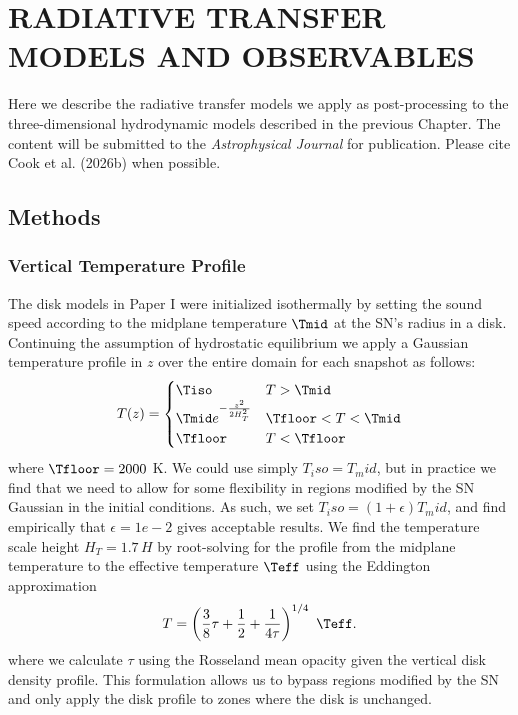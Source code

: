 \section{\texorpdfstring{\MakeUppercase{radiative transfer models and observables}}{radiative transfer models and observables}}
\label{sec:sn-rt}



Here we describe the radiative transfer models we apply as post-processing to the three-dimensional hydrodynamic models described in the previous Chapter.
The content will be submitted to the \textit{Astrophysical Journal} for publication.
Please cite Cook et al. (2026b) when possible.


\subsection{Methods} \label{sec:methods}


\subsubsection{Vertical Temperature Profile} \label{subsec:temperature-profile}

The disk models in Paper I were initialized isothermally by setting the sound speed according to the midplane temperature $\Tmid$ at the SN's radius in a \citet{SirkoGoodman03} disk.
Continuing the assumption of hydrostatic equilibrium we apply a Gaussian temperature profile in $z$ over the entire domain for each snapshot as follows:
\begin{equation}
\label{eqn:temp-profile}
    T(z) =
    \begin{cases}
	\Tiso & T>\Tmid \\
	\Tmid e^{- \frac{z^2}{2 H_T^2}} & \Tfloor < T < \Tmid \\
	\Tfloor & T<\Tfloor
    \end{cases}
\end{equation}
where $\Tfloor=2000$ K.
We could use simply $T_iso = T_mid$, but in practice we find that we need to allow for some flexibility in regions modified by the SN Gaussian in the initial conditions.
As such, we set $T_iso = (1+\epsilon) T_mid$, and find empirically that $\epsilon=1e-2$ gives acceptable results.
We find the temperature scale height $H_T=1.7\,H$ by root-solving for the profile from the midplane temperature to the effective temperature $\Teff$ using the Eddington approximation
\begin{equation}
	T = \left( \frac{3}{8} \tau + \frac{1}{2} + \frac{1}{4\tau} \right)^{1/4}\ \Teff.
\end{equation}
where we calculate $\tau$ using the Rosseland mean opacity given the vertical disk density profile.
This formulation allows us to bypass regions modified by the SN and only apply the disk profile to zones where the disk is unchanged.


